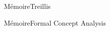 \begin{frame}{Mémoire}{Treillis}

\end{frame}

\begin{frame}{Mémoire}{Formal Concept Analysis}

\end{frame}